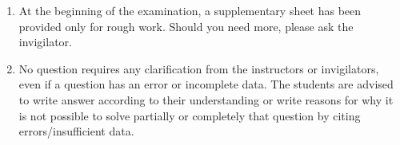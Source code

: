 \documentclass[addpoints,answers,a4paper,11pt]{exam}
\begin{document}
{\begin{enumerate}
         number of additional page in the original space.
      \item At the beginning of the examination, a supplementary sheet has been
         provided only for rough work. Should you need more, please ask the
         invigilator.
      \item No question requires any clarification from the instructors or
         invigilators, even if a question has an error or incomplete data. The
         students are advised to write answer according to their understanding
         or write reasons for why it is not possible to solve partially or
         completely that question by citing errors/insufficient data. 
   \end{enumerate}


   \vspace{0.2in}
   \begin{center}
      \cellwidth{12mm} 
      \gradetable[h][questions]
   \end{center}

   \newpage

}
\end{document}
